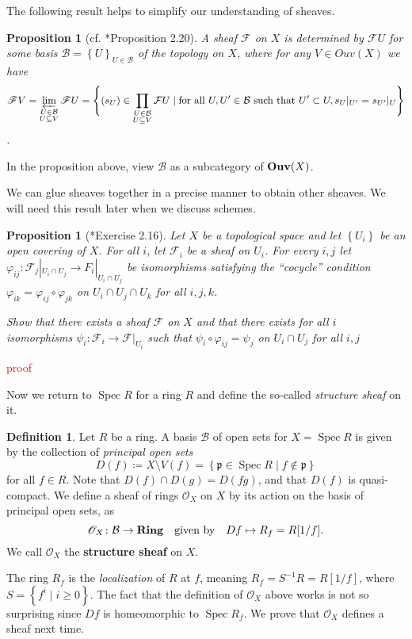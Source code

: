 \documentclass[11pt,leqno]{article}
\newcommand{\sai}[1]{\textcolor{red}{#1}}
\theoremstyle{plain}
\newtheorem{proposition}[lem]{Proposition}
\theoremstyle{definition}
\newtheorem{definition/}[lem]{Definition}
\newenvironment{definition}
  {\renewcommand{\qedsymbol}{\textdagger}%
   \pushQED{\qed}\begin{definition/}}
  {\popQED\end{definition/}}
\numberwithin{equation}{section}
\numberwithin{lem}{section}
\newcommand{\cbr}[1]{\left\{#1\right\}}
\newcommand{\bidx}[1]{\textbf{#1\index{#1}}} %
\DeclareMathOperator{\Spec}{Spec}
\newcommand{\catname}[1]{{\normalfont\mathbf{#1}}}
\newcommand{\Ring}{\catname{Ring}}
\newcommand{\Ouv}{\catname{Ouv}}
\begin{document}
The following result helps to simplify our understanding of sheaves.
\begin{proposition}[cf. \cite{gw}*{Proposition 2.20}]
    A sheaf $\mathscr F$ on $X$ is determined by $\mathscr FU$ for some basis $\mathcal B = \cbr{U}_{U\in\mathcal B}$ of the topology on $X$, where for any $V\in Ouv(X)$ we have 
    \begin{equation}
        \mathscr FV = \varprojlim_{\substack{U\in \mathcal B\\U\subseteq V}}\mathscr FU = \Bigg\{(s_U)\in \prod_{\substack{U\in \mathcal B\\U\subseteq V}}\mathcal FU\mid \text{for all }U,U^\prime\in\mathcal B \text{ such that } U^\prime\subset U, s_U|_{U^\prime} = s_{U^\prime}|_U\Bigg\}
    \end{equation}.
\end{proposition}
In the proposition above, view $\mathcal B$ as a subcategory of $\Ouv(X)$.

We can glue sheaves together in a precise manner to obtain other sheaves. We will need this result later when we discuss schemes.
\begin{proposition}[\cite{gw}*{Exercise 2.16}]
    Let $X$ be a topological space and let $\cbr{U_i}$ be an open covering of $X$. For all $i$, let $\mathscr F_i$ be a sheaf on $U_i$. For every $i,j$ let $\varphi_{ij}\colon \mathscr F_j|_{U_i\cap U_j}\to F_i|_{U_i\cap U_j}$ be isomorphisms satisfying the ``cocycle'' condition $\varphi_{ik} = \varphi_{ij}\circ\varphi_{jk}$ on $U_i\cap U_j\cap U_k$ for all $i,j,k$.

    Show that there exists a sheaf $\mathscr F$ on $X$ and that there exists for all $i$ isomorphisms $\psi_i\colon \mathcal F_i \to \mathscr F|_{U_i}$ such that $\psi_i \circ \varphi_{ij} = \psi_j$ on $U_i\cap U_j$ for all $i,j$
\end{proposition}
\sai{proof}

Now we return to $\Spec R$ for a ring $R$ and define the so-called \textit{structure sheaf} on it.
\begin{definition}
    Let $R$ be a ring. A basis $\mathcal B$ of open sets for $X=\Spec R$ is given by the collection of \textit{principal open sets} 
    \begin{equation}
        D(f) \coloneqq X\setminus V(f) = \cbr{\mathfrak p\in\Spec R\mid f\not\in \mathfrak p}
    \end{equation}
    for all $f\in R$. Note that $D(f)\cap D(g) = D(fg)$, and that $D(f)$ is quasi-compact.
    We define a sheaf of rings \bidx{$\mathscr O_X$} on $X$ by its action on the basis of principal open sets, as
    \begin{equation}
        \mathscr O_X\colon \mathcal B\to \Ring \quad\text{given by}\quad Df\mapsto R_f = R[1/f].
    \end{equation}
    We call $\mathscr O_X$ the \bidx{structure sheaf} on $X$.
\end{definition}
The ring $R_f$ is the \textit{localization} of $R$ at $f$, meaning $R_f = S^{-1}R = R[1/f]$, where $S = \cbr{f^i\mid i\geq 0}$. The fact that the definition of $\mathscr O_X$ above works is not so surprising since $Df$ is homeomorphic to $\Spec R_f$. We prove that $\mathscr O_X$ defines a sheaf next time.
\end{document}
